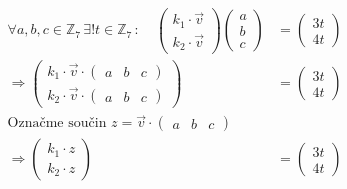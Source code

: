 \documentclass[12pt]{article}
\begin{document}
\begin{enumerate}
\begin{enumerate}
    \begin{align*}
      \forall a,b,c \in \mathbb{Z}_7 \,\exists ! t \in \mathbb{Z}_7 \,: \quad 
      \left(\begin{array}{c} k_1 \cdot \vec{v} \\ \hline k_2 \cdot \vec{v} \end{array}\right)
      \left( \begin{array}{c}
        a \\ b \\ c
      \end{array} \right) &= \left( \begin{array}{c}
        3t \\ 4t
      \end{array} \right) \\
      \Longrightarrow 
      \left(\begin{array}{c} k_1 \cdot \vec{v} \cdot 
        \left( \begin{array}{ccc} a & b & c \end{array} \right) \\ \hline k_2 \cdot \vec{v} \cdot 
        \left( \begin{array}{ccc} a & b & c \end{array} \right) \end{array}\right)
      &= \left( \begin{array}{c}
        3t \\ 4t
      \end{array} \right) \\
      \text{Označme součin } z = \vec{v} \cdot \left( \begin{array}{ccc} a & b & c \end{array} \right) \\
      \Longrightarrow \left(\begin{array}{c} k_1 \cdot z \\ \hline k_2 \cdot z \end{array}\right)
      &= \left( \begin{array}{c}
        3t \\ 4t
      \end{array} \right)
    \end{align*}


\end{enumerate}
\end{enumerate}
\end{document}
